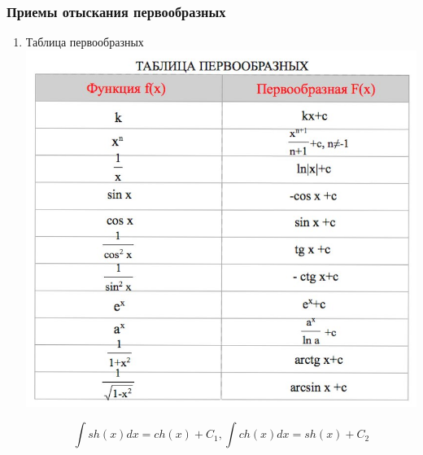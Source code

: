 \documentclass[a4paper]{article}
\theoremstyle{definition}
\newtheorem*{comment}{Замечание}
\numberwithin{theorem}{subsection}
\numberwithin{lemma}{subsection}
\numberwithin{definition}{subsection}
\numberwithin{comment*}{subsection}
\numberwithin{consequence}{subsection}
\numberwithin{property}{subsection}
\begin{document}
\subsubsection{Приемы отыскания первообразных}
\begin{enumerate}

 \item Таблица первообразных\\
       \includegraphics{pervoobraz}

       $$\int sh(x)dx = ch(x)+C_1, \int ch(x)dx = sh(x)+C_2$$


\end{enumerate}
\end{document}

